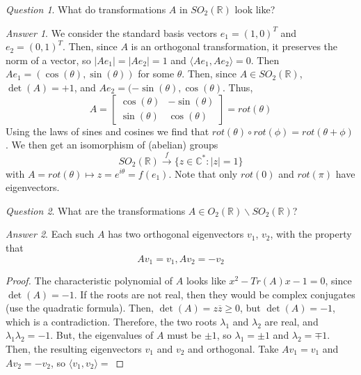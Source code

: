 \documentclass[12pt]{article}
\theoremstyle{definition}
\theoremstyle{remark}
\newtheorem*{qst}{Question}
\newtheorem*{ans}{Answer}
\numberwithin{equation}{section}
\newcommand\C{\mathbb C}    %
\newcommand\R{\mathbb R}    %
\begin{document}
\begin{qst}
        What do transformations $A$ in $SO_2(\R)$ look like?
\end{qst}
\begin{ans}
        We consider the standard basis vectors $e_1 = (1,0)^T$ and $e_2 = (0,1)^T$. Then, since $A$ is an orthogonal transformation, it preserves the norm of a vector, so $|Ae_1| = |Ae_2| = 1$ and $\langle Ae_1, Ae_2 \rangle = 0$. Then $Ae_1 = (\cos(\theta),\sin(\theta))$ for some $\theta$. Then, since $A \in SO_2(\R)$, $\det(A) = +1$, and $Ae_2 = (-\sin(\theta),\cos(\theta)$. Thus, \begin{equation}
                A = \begin{bmatrix} \cos(\theta) & -\sin(\theta) \\ \sin(\theta) & \cos(\theta) \end{bmatrix} = rot(\theta)
        \end{equation}
        Using the laws of sines and cosines we find that $rot(\theta)\circ rot(\phi) = rot(\theta + \phi)$. We then get an isomorphism of (abelian) groups \begin{equation}
                SO_2(\R)\xrightarrow{f}\{z\in\C^*:|z| = 1\}
        \end{equation}
        with $A=rot(\theta)\mapsto z = e^{i\theta} = f(e_1)$. Note that only $rot(0)$ and $rot(\pi)$ have eigenvectors.
\end{ans}

\vspace{15pt}

\begin{qst}
        What are the transformations $A \in O_2(\R)\backslash SO_2(\R)$?
\end{qst}

\begin{ans}
        Each such $A$ has two orthogonal eigenvectors $v_1$, $v_2$, with the property that \begin{equation}
                Av_1 = v_1, Av_2 = -v_2
        \end{equation}
\end{ans}
\begin{proof}
        The characteristic polynomial of $A$ looks like $x^2 - Tr(A)x - 1 = 0$, since $\det(A) = -1$. If the roots are not real, then they would be complex conjugates (use the quadratic formula). Then, $\det(A) = z\overline{z} \geq 0$, but $\det(A) = -1$, which is a contradiction. Therefore, the two roots $\lambda_1$ and $\lambda_2$ are real, and $\lambda_1\lambda_2 = -1$. But, the eigenvalues of $A$ must be $\pm 1$, so $\lambda_1 = \pm 1$ and $\lambda_2 = \mp 1$. Then, the resulting eigenvectors $v_1$ and $v_2$ and orthogonal. Take $Av_1 = v_1$ and $Av_2 = -v_2$, so $\langle v_1,v_2 \rangle = $
\end{proof}
\end{document}
